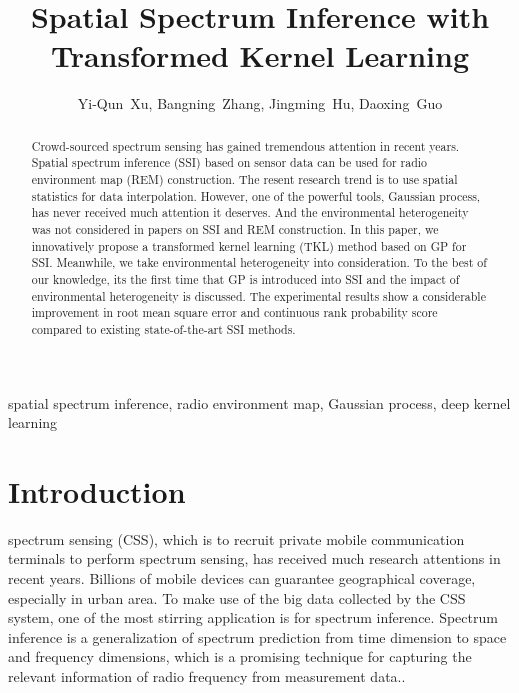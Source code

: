 \documentclass[journal, oneside, twocolumn]{IEEEtran}
\date{}
\title{Spatial Spectrum Inference with Transformed Kernel Learning}
\begin{document}
\author{
  Yi-Qun~Xu,
  Bangning~Zhang, %
  Jingming~Hu, 
  Daoxing~Guo%

}


\maketitle

\begin{abstract}
Crowd-sourced spectrum sensing has gained tremendous attention in recent years. Spatial spectrum inference (SSI) based on sensor data can be used for radio environment map (REM) construction. The resent research trend is to use spatial statistics for data interpolation. However, one of the powerful tools, Gaussian process, has never received much attention it deserves. And the environmental heterogeneity was not considered in papers on SSI and REM construction. In this paper, we innovatively propose a transformed kernel learning (TKL) method based on GP for SSI. Meanwhile, we take environmental heterogeneity into consideration. To the best of our knowledge, its the first time that GP is introduced into SSI and the impact of environmental heterogeneity is discussed. The experimental results show a considerable improvement in root mean square error and continuous rank probability score compared to existing state-of-the-art SSI methods.
\end{abstract}

\begin{IEEEkeywords}
  spatial spectrum inference, radio environment map, Gaussian process, deep kernel learning
\end{IEEEkeywords}

\section{Introduction}
 spectrum sensing (CSS), which is to recruit private mobile communication terminals to perform spectrum sensing, has received much research attentions \cite{Ding2014, Jin2018, Han2019, Hu2020, Amin2020} in recent years. Billions of mobile devices can guarantee geographical coverage, especially in urban area. To make use of the big data collected by the CSS system, one of the most stirring application is for spectrum inference. Spectrum inference is a generalization of spectrum prediction from time dimension to space and frequency dimensions, which is a promising technique for capturing the relevant information of radio frequency from measurement data.\cite{Ding2018}.
\end{document}
